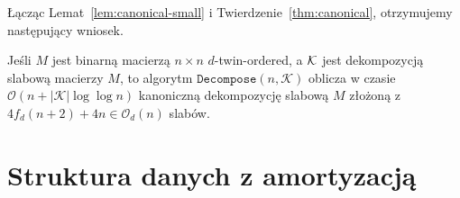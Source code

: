 \documentclass[runningheads]{llncs}
\newcommand{\Oh}{\mathcal{O}}
\begin{document}

Łącząc Lemat~\ref{lem:canonical-small} i Twierdzenie~\ref{thm:canonical}, otrzymujemy następujący wniosek.

\begin{corollary}\label{cor:canonical}
	Jeśli $M$ jest binarną macierzą $n\times n$ $d$-twin-ordered, a $\cal K$ jest dekompozycją slabową macierzy $M$, to algorytm $\mathtt{Decompose}(n,\mathcal{K})$ oblicza w czasie $\Oh(n+|\mathcal{K}|\log \log n)$ kanoniczną dekompozycję slabową $M$ złożoną z
	$4 f_d (n+2)+4n \in \Oh_d(n)$ slabów.
\end{corollary}
 
\section{Struktura danych z amortyzacją}
\label{sec:amortized}
\end{document}
